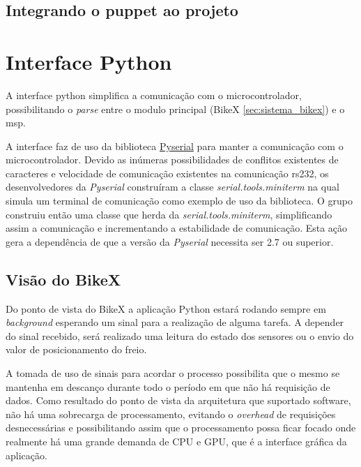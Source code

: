 \subsection{Integrando o puppet ao projeto} %
\label{sub:integrando_o_puppet_ao_projeto}


\section{Interface Python} %
\label{sec:interface_python}

A interface \gls{python} simplifica a comunicação com o microcontrolador, possibilitando o \textit{parse} entre o modulo principal (BikeX \ref{sec:sistema_bikex}) e o \gls{msp}.

A interface faz de uso da biblioteca \href{http://pyserial.sourceforge.net/pyserial.html}{Pyserial} para manter a comunicação com o microcontrolador. Devido as inúmeras possibilidades de conflitos existentes de caracteres e velocidade de comunicação existentes na comunicação \gls{rs232}, os desenvolvedores da \textit{Pyserial} construíram a classe \textit{serial.tools.miniterm} na qual simula um terminal de comunicação como exemplo de uso da biblioteca. O grupo construiu então uma classe que herda da \textit{serial.tools.miniterm}, simplificando assim a comunicação e incrementando a estabilidade de comunicação. Esta ação gera a dependência de que a versão da \textit{Pyserial} necessita ser 2.7 ou superior.

\subsection{Visão do BikeX} %
\label{sub:vis_o_do_bikex}

Do ponto de vista do BikeX a aplicação Python estará rodando sempre em \textit{background} esperando um sinal para a realização de alguma tarefa. A depender do sinal recebido, será realizado uma leitura do estado dos sensores ou o envio do valor de posicionamento do freio.

A tomada de uso de sinais para acordar o processo possibilita que o mesmo se mantenha em descanço durante todo o período em que não há requisição de dados. Como resultado do ponto de vista da arquitetura que suportado software, não há uma sobrecarga de processamento, evitando o \textit{overhead} de requisições desnecessárias e possibilitando assim que o processamento possa ficar focado onde realmente há uma grande demanda de CPU e GPU, que é a interface gráfica da aplicação.

